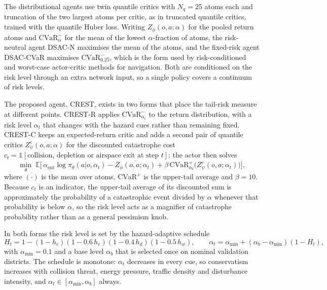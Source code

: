 The distributional agents use twin quantile critics with $N_q=25$ atoms each and truncation of the two largest atoms per critic, as in truncated quantile critics\cite{kuznetsov2020tqc}, trained with the quantile Huber loss\cite{dabney2018qr}. Writing $Z_\phi(o,a;\alpha)$ for the pooled return atoms and $\mathrm{CVaR}^-_\alpha$ for the mean of the lowest $\alpha$-fraction of atoms\cite{rockafellar2000cvar}, the risk-neutral agent DSAC-N maximises the mean of the atoms, and the fixed-risk agent DSAC-CVaR maximises $\mathrm{CVaR}^-_{0.25}$, which is the form used by risk-conditioned and worst-case actor-critic methods for navigation\cite{choi2021rcdsac,yang2021wcsac,ma2025dsac}. Both are conditioned on the risk level through an extra network input, so a single policy covers a continuum of risk levels\cite{choi2021rcdsac}.

The proposed agent, CREST, exists in two forms that place the tail-risk measure at different points. CREST-R applies $\mathrm{CVaR}^-_{\alpha_t}$ to the return distribution, with a risk level $\alpha_t$ that changes with the hazard cues rather than remaining fixed. CREST-C keeps an expected-return critic and adds a second pair of quantile critics $Z^c_\psi(o,a;\alpha)$ for the discounted catastrophe cost $c_t=\mathbb{1}[\text{collision, depletion or airspace exit at step } t]$; the actor then solves
\begin{equation}
\min_\theta\; \mathbb{E}\Big[\,\alpha_{\mathrm{ent}}\log\pi_\theta(a|o,\alpha_t) - \overline{Z_\phi(o,a;\alpha_t)} + \beta\,\mathrm{CVaR}^+_{\alpha_t}\!\big(Z^c_\psi(o,a;\alpha_t)\big)\Big],
\label{eq:crestc}
\end{equation}
where $\overline{(\cdot)}$ is the mean over atoms, $\mathrm{CVaR}^+$ is the upper-tail average and $\beta=10$. Because $c_t$ is an indicator, the upper-tail average of its discounted sum is approximately the probability of a catastrophic event divided by $\alpha$ whenever that probability is below $\alpha$, so the risk level acts as a magnifier of catastrophe probability rather than as a general pessimism knob.

In both forms the risk level is set by the hazard-adaptive schedule
\begin{equation}
H_t = 1-(1-h_c)(1-0.6\,h_e)(1-0.4\,h_d)(1-0.5\,h_w), \qquad \alpha_t = \alpha_{\min} + (\alpha_b-\alpha_{\min})(1-H_t),
\label{eq:schedule}
\end{equation}
with $\alpha_{\min}=0.1$ and a base level $\alpha_b$ that is selected once on nominal validation districts. The schedule is monotone: $\alpha_t$ decreases in every cue, so conservatism increases with collision threat, energy pressure, traffic density and disturbance intensity, and $\alpha_t\in[\alpha_{\min},\alpha_b]$ always.

